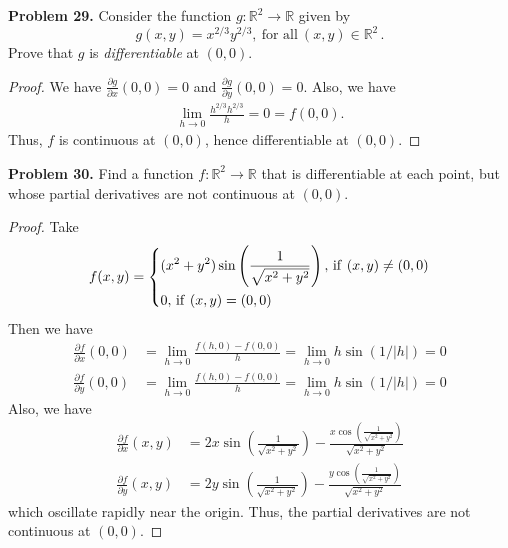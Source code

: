 \documentclass[12pt,leqno]{amsart}
\theoremstyle{definition}
\begin{document}
\noindent
{\bf Problem 29.}
Consider the function $g : \mathbb{R}^2 \to \mathbb{R}$ given by
$$
g(x, y) = x^{2/3}y^{2/3}, \ \text{for all} \ (x, y) \in \mathbb{R}^2 \,
.
$$
Prove that $g$ is {\it differentiable} at $(0, 0)$.
\begin{proof}
We have $\frac{\partial g}{\partial x}(0,0) = 0$ and $\frac{\partial g}{\partial y}(0,0) = 0$. Also, we have
\begin{align*}
    \lim_{h\to0} \frac{h^{2/3}h^{2/3}}{h} = 0 = f(0,0).
\end{align*}
Thus, $f$ is continuous at $(0,0)$, hence differentiable at $(0,0)$.
\end{proof}

\medskip

\noindent
{\bf Problem 30.}
Find a function $f:\mathbb{R}^2\to\mathbb{R}$ that is differentiable at each point,
but whose partial derivatives are not continuous at $(0,0)$.
\begin{proof}
Take 
\begin{align*}
    f(x,y) = \left\{
    \begin{aligned}
        & (x^2 + y^2) \sin \left(\frac{1}{\sqrt{x^2 + y^2}}\right),\, {\rm if }\,\, (x,y)\neq (0,0)\\
        & 0, \, {\rm if }\,\, (x,y) = (0,0)
    \end{aligned}
    \right.
\end{align*}
Then we have 
\begin{align*}
    \frac{\partial f}{\partial x}(0,0) & = \lim_{h\to 0} \frac{f(h,0) - f(0,0)}{h} = \lim_{h\to 0} h \sin \left(1/|h|\right) = 0 \\
    \frac{\partial f}{\partial y}(0,0) & = \lim_{h\to 0} \frac{f(h,0) - f(0,0)}{h} = \lim_{h\to 0} h \sin \left(1/|h|\right) = 0 
\end{align*}
Also, we have
\begin{align*}
    \frac{\partial f}{\partial x}(x,y) & = 2x \sin \left(\frac{1}{\sqrt{x^2 + y^2}}\right) - \frac{x \cos \left(\frac{1}{\sqrt{x^2 + y^2}}\right)}{\sqrt{x^2 + y^2}} \\
    \frac{\partial f}{\partial y}(x,y) & = 2y \sin \left(\frac{1}{\sqrt{x^2 + y^2}}\right) - \frac{y \cos \left(\frac{1}{\sqrt{x^2 + y^2}}\right)}{\sqrt{x^2 + y^2}}
\end{align*}
which oscillate rapidly near the origin. Thus, the partial derivatives are not continuous at $(0,0)$.
\end{proof}

\medskip
\end{document}

